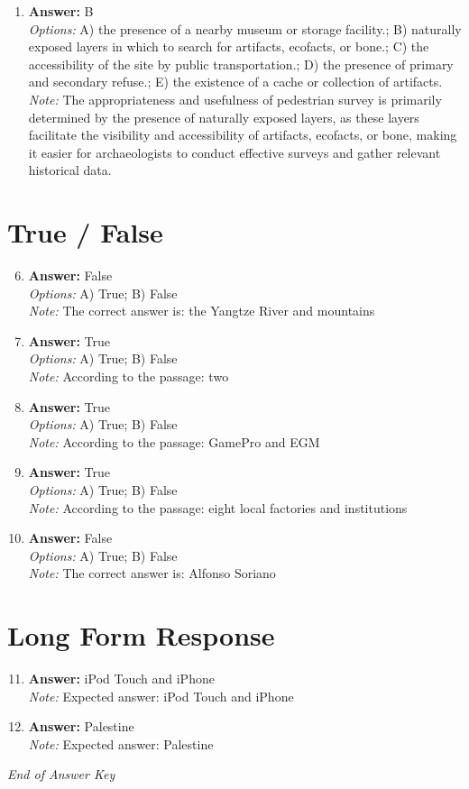 \documentclass[12pt]{article}
\begin{document}
\begin{enumerate}[label=\arabic*.]
\item \textbf{Answer:} B
\\ \textit{Options:} A) the presence of a nearby museum or storage facility.; B) naturally exposed layers in which to search for artifacts, ecofacts, or bone.; C) the accessibility of the site by public transportation.; D) the presence of primary and secondary refuse.; E) the existence of a cache or collection of artifacts.
\\ \textit{Note:} The appropriateness and usefulness of pedestrian survey is primarily determined by the presence of naturally exposed layers, as these layers facilitate the visibility and accessibility of artifacts, ecofacts, or bone, making it easier for archaeologists to conduct effective surveys and gather relevant historical data.
\end{enumerate}

\section*{True / False}
\begin{enumerate}[label=\arabic*.]
\setcounter{enumi}{5}
\item \textbf{Answer:} False
\\ \textit{Options:} A) True; B) False
\\ \textit{Note:} The correct answer is: the Yangtze River and mountains
\item \textbf{Answer:} True
\\ \textit{Options:} A) True; B) False
\\ \textit{Note:} According to the passage: two
\item \textbf{Answer:} True
\\ \textit{Options:} A) True; B) False
\\ \textit{Note:} According to the passage: GamePro and EGM
\item \textbf{Answer:} True
\\ \textit{Options:} A) True; B) False
\\ \textit{Note:} According to the passage: eight local factories and institutions
\item \textbf{Answer:} False
\\ \textit{Options:} A) True; B) False
\\ \textit{Note:} The correct answer is: Alfonso Soriano
\end{enumerate}

\section*{Long Form Response}
\begin{enumerate}[label=\arabic*.]
\setcounter{enumi}{10}
\item \textbf{Answer:} iPod Touch and iPhone
\\ \textit{Note:} Expected answer: iPod Touch and iPhone
\item \textbf{Answer:} Palestine
\\ \textit{Note:} Expected answer: Palestine
\end{enumerate}

\vfill
\noindent\textit{End of Answer Key}
\end{document}
